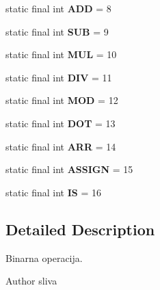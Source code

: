 \begin{DoxyCompactItemize}
static final int {\bfseries A\+DD} = 8
\item 
\mbox{\label{classcompiler_1_1imcode_1_1_imc_b_i_n_o_p_a61ece653797d9dfcb86295575320585e}} 
static final int {\bfseries S\+UB} = 9
\item 
\mbox{\label{classcompiler_1_1imcode_1_1_imc_b_i_n_o_p_a10e852d5455d72f6d4227c93671dd6a5}} 
static final int {\bfseries M\+UL} = 10
\item 
\mbox{\label{classcompiler_1_1imcode_1_1_imc_b_i_n_o_p_afdbba74abcebd3d4b3ae9995dcd12a46}} 
static final int {\bfseries D\+IV} = 11
\item 
\mbox{\label{classcompiler_1_1imcode_1_1_imc_b_i_n_o_p_a4cf24f3efcd3d363e7a3769a7fd880ef}} 
static final int {\bfseries M\+OD} = 12
\item 
\mbox{\label{classcompiler_1_1imcode_1_1_imc_b_i_n_o_p_a0087a577a8ce29dee804f391835c9c91}} 
static final int {\bfseries D\+OT} = 13
\item 
\mbox{\label{classcompiler_1_1imcode_1_1_imc_b_i_n_o_p_afde8ff24312504d59a177747650c3e8a}} 
static final int {\bfseries A\+RR} = 14
\item 
\mbox{\label{classcompiler_1_1imcode_1_1_imc_b_i_n_o_p_af09ca38d534b141e7f5901989a5e89c5}} 
static final int {\bfseries A\+S\+S\+I\+GN} = 15
\item 
\mbox{\label{classcompiler_1_1imcode_1_1_imc_b_i_n_o_p_a2a02ae0cce646bdc108b05065253b581}} 
static final int {\bfseries IS} = 16
\end{DoxyCompactItemize}


\subsection{Detailed Description}
Binarna operacija.

\begin{DoxyAuthor}{Author}
sliva 
\end{DoxyAuthor}


